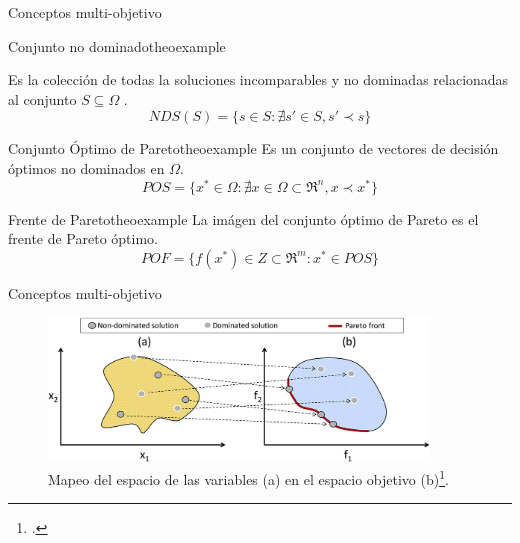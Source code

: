 \documentclass{beamer}
\begin{document}
\begin{frame}{Conceptos multi-objetivo}

\begin{mydef}{ \scriptsize Conjunto no dominado}{theoexample}
\scriptsize
    \item Es la colección de todas la soluciones incomparables y no dominadas relacionadas al conjunto $S \subseteq \Omega$ .
    \begin{equation*}
        NDS(S) = \{ s \in S: \nexists s\prime \in S, s\prime \prec s \}
    \end{equation*}
\end{mydef}

\begin{mydef}{\scriptsize Conjunto Óptimo de Pareto}{theoexample}
\scriptsize
Es un conjunto de vectores de decisión óptimos no dominados en $\Omega$.
       \begin{equation*}
        POS = \{ x^* \in \Omega : \nexists x \in \Omega \subset \Re^n, x \prec x^*  \}
    \end{equation*}
\end{mydef}

\begin{mydef}{\scriptsize Frente de Pareto}{theoexample}
\scriptsize
    La imágen del conjunto óptimo de Pareto es el frente de Pareto óptimo. 
        \begin{equation*}
             POF = \{ f(x^*) \in Z \subset \Re^m: x^* \in POS \} 
        \end{equation*}
\end{mydef}

\end{frame}


\begin{frame}{Conceptos multi-objetivo}

\begin{figure}[H]
\centering
\includegraphics[width=0.9\textwidth]{Mapping.jpg}
\caption{\scriptsize Mapeo del espacio de las variables (a) en el espacio objetivo (b)\footcite{alam2012diversity}.}
\end{figure}
\end{frame}
\end{document}
